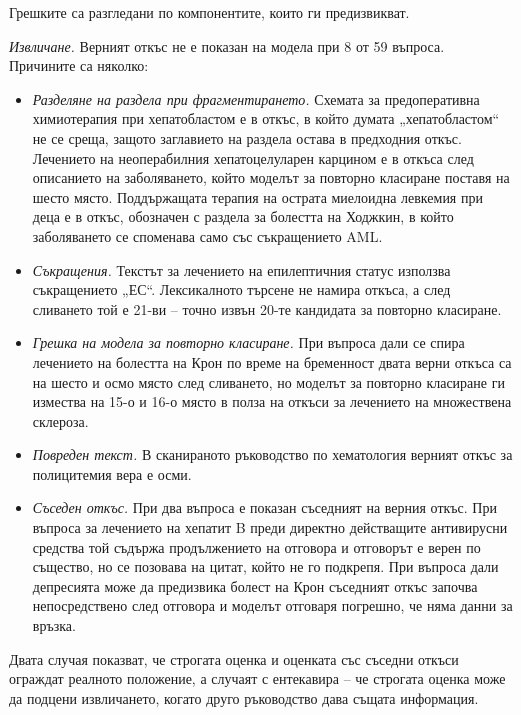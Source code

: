 \documentclass[12pt,a4paper]{article}
\makeatletter
\renewcommand\paragraph{\@startsection{paragraph}{4}{\z@}{1.5ex \@plus .5ex \@minus .2ex}{-1em}{\normalfont\normalsize\bfseries}}
\makeatother
\begin{document}
\paragraph{Анализ на грешките.} Грешките са разгледани по компонентите, които ги предизвикват.

\emph{Извличане.} Верният откъс не е показан на модела при 8 от 59 въпроса. Причините са няколко:
\begin{itemize}[noitemsep]
\item \emph{Разделяне на раздела при фрагментирането.} Схемата за предоперативна химиотерапия при хепатобластом е в откъс, в който думата „хепатобластом“ не се среща, защото заглавието на раздела остава в предходния откъс. Лечението на неоперабилния хепатоцелуларен карцином е в откъса след описанието на заболяването, който моделът за повторно класиране поставя на шесто място. Поддържащата терапия на острата миелоидна левкемия при деца е в откъс, обозначен с раздела за болестта на Ходжкин, в който заболяването се споменава само със съкращението AML.
\item \emph{Съкращения.} Текстът за лечението на епилептичния статус използва съкращението „ЕС“. Лексикалното търсене не намира откъса, а след сливането той е 21-ви -- точно извън 20-те кандидата за повторно класиране.
\item \emph{Грешка на модела за повторно класиране.} При въпроса дали се спира лечението на болестта на Крон по време на бременност двата верни откъса са на шесто и осмо място след сливането, но моделът за повторно класиране ги измества на 15-о и 16-о място в полза на откъси за лечението на множествена склероза.
\item \emph{Повреден текст.} В сканираното ръководство по хематология верният откъс за полицитемия вера е осми.
\item \emph{Съседен откъс.} При два въпроса е показан съседният на верния откъс. При въпроса за лечението на хепатит B преди директно действащите антивирусни средства той съдържа продължението на отговора и отговорът е верен по същество, но се позовава на цитат, който не го подкрепя. При въпроса дали депресията може да предизвика болест на Крон съседният откъс започва непосредствено след отговора и моделът отговаря погрешно, че няма данни за връзка.
\end{itemize}
Двата случая показват, че строгата оценка и оценката със съседни откъси ограждат реалното положение, а случаят с ентекавира -- че строгата оценка може да подцени извличането, когато друго ръководство дава същата информация.
\end{document}
